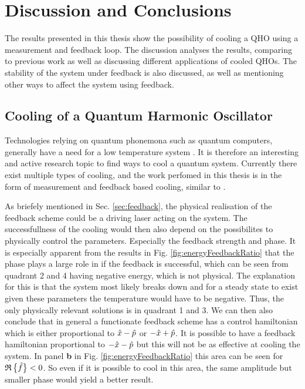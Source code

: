 \section{Discussion and Conclusions}
The results presented in this thesis show the possibility of cooling a QHO using a measurement and feedback loop. The discussion analyses the results, comparing to previous work as well as discussing different applications of cooled QHOs. The stability of the system under feedback is also discussed, as well as mentioning other ways to affect the system using feedback. 

\subsection{Cooling of a Quantum Harmonic Oscillator}
Technologies relying on quantum phonemona such as quantum computers, generally have a need for a low temperature system \cite{Nielsen:2010}. It is therefore an interesting and active research topic to find ways to cool a quantum system. Currently there exist multiple types of cooling, and the work perfomed in this thesis is in the form of measurement and feedback based cooling, similar to \cite{De-Sousa:2025}.

As briefely mentioned in Sec. \ref{sec:feedback}, the physical realisation of the feedback scheme could be a driving laser acting on the system. The successfullness of the cooling would then also depend on the possibilites to physically control the parameters. Especially the feedback strength and phase. It is especially apparent from the results in Fig. \ref{fig:energyFeedbackRatio} that the phase plays a large role in if the feedback is successful, which can be seen from quadrant 2 and 4 having negative energy, which is not physical. The explanation for this is that the system most likely breaks down and for a steady state to exist given these parameters the temperature would have to be negative. Thus, the only physically relevant solutions is in quadrant 1 and 3. We can then also conclude that in general a functionate feedback scheme has a control hamiltonian which is either proportional to $\hat{x} - \hat{p}$ or $-\hat{x} + \hat{p}$. It is possible to have a feedback hamiltonian proportional to $-\hat{x} - \hat{p}$ but this will not be as effective at cooling the system. In panel \textbf{b} in Fig. \ref{fig:energyFeedbackRatio} this area can be seen for $\mathfrak{R}\left\{\tilde{f}\right\} < 0$. So even if it is possible to cool in this area, the same amplitude but smaller phase would yield a better result.


